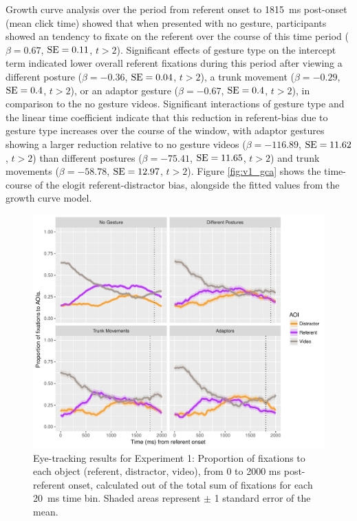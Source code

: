 \documentclass[a4paper,man,natbib]{apa6}
\newcommand{\resultsLM}[3]{$\beta = #1$, $\textnormal{SE} = #2$, $t #3$}
\begin{document}
Growth curve analysis over the period from referent onset to 1815~ms post-onset (mean click time) showed that when presented with no gesture, participants showed an tendency to fixate on the referent over the course of this time period (\resultsLM{0.67}{0.11}{>2}). %
Significant effects of gesture type on the intercept term indicated lower overall referent fixations during this period after viewing a different posture (\resultsLM{-0.36}{0.04}{>2}), a trunk movement (\resultsLM{-0.29}{0.4}{>2}), or an adaptor gesture (\resultsLM{-0.67}{0.4}{>2}), in comparison to the no gesture videos.
Significant interactions of gesture type and the linear time coefficient indicate that this reduction in referent-bias due to gesture type increases over the course of the window, with adaptor gestures showing a larger reduction relative to no gesture videos (\resultsLM{-116.89}{11.62}{>2}) than different postures (\resultsLM{-75.41}{11.65}{>2}) and trunk movements (\resultsLM{-58.78}{12.97}{>2}).
Figure \ref{fig:v1_gca} shows the time-course of the elogit referent-distractor bias, alongside the fitted values from the growth curve model. 

\begin{figure}[Ht]
  \centering
	\includegraphics[width=\linewidth]{./img/e7_fixations.pdf}
  \caption{Eye-tracking results for Experiment 1: Proportion of fixations to each object (referent, distractor, video), from 0 to 2000 ms post-referent onset, calculated out of the total sum of fixations for each 20~ms time bin. Shaded areas represent $\pm$ 1 standard error of the mean.}
  \label{fig:v1_eye}
\end{figure}
\end{document}
